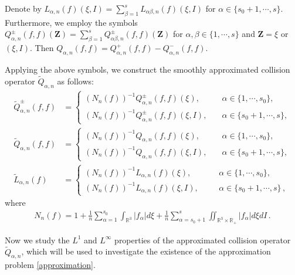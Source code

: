 \documentclass[reqno,11pt]{amsart}
\numberwithin{equation}{section}
\def\R{\mathbb{R}}
\begin{document}
Denote by $L_{\alpha, n} (f) (\xi, I) = \sum_{\beta = 1}^{s} L_{\alpha \beta, n} (f) (\xi, I) $ for $\alpha \in \{ s_0 + 1, \cdots, s \} $. Furthermore, we employ the symbols $Q_{\alpha, n}^\pm (f,f) (\mathbf{Z}) = \sum_{\beta = 1}^{s} Q_{\alpha \beta, n}^\pm (f, f) (\mathbf{Z})$ for $\alpha, \beta \in \{ 1, \cdots, s \}$ and $ \mathbf{Z} = \xi $ or $(\xi, I)$. Then $Q_{\alpha ,n } (f,f) = Q^+_{\alpha ,n } (f,f) -Q^-_{\alpha ,n } (f,f)$.

Applying the above symbols, we construct the smoothly approximated collision operator $\tilde{Q}_{\alpha, n}$ as follows: 
\begin{equation}\label{Q L}
	\begin{aligned}
		\tilde{Q}^\pm _{\alpha ,n } (f,f) &=
		\begin{cases}
			( N_n (f) )^{-1} Q^\pm _{\alpha ,n } (f,f)(\xi ), \quad &\alpha \in \{1,\cdots, s_0 \},\\
			( N_n (f) )^{-1} Q^\pm _{\alpha ,n } (f,f)(\xi ,I ), \quad &\alpha \in \{s_0+1,\cdots, s \},
		\end{cases} \\
			\tilde{Q}_{\alpha ,n } (f,f) &=
		\begin{cases}
			( N_n (f) )^{-1} Q_{\alpha ,n } (f,f)(\xi ), \quad &\alpha \in \{1,\cdots, s_0 \},\\
			( N_n (f) )^{-1} Q_{\alpha ,n } (f,f)(\xi ,I ), \quad &\alpha \in \{s_0+1,\cdots, s \},
		\end{cases}\\
		\tilde{L} _{\alpha ,n } (f) &=
		\begin{cases}
			( N_n (f) )^{-1} L _{\alpha ,n } (f)(\xi ), \quad & \ \ \ \alpha \in \{1,\cdots, s_0 \},\\
			( N_n (f) )^{-1} L _{\alpha ,n } (f)(\xi ,I ), \quad & \ \ \ \alpha \in \{s_0+1,\cdots, s \} \,, 
		\end{cases}
	\end{aligned}
\end{equation}
where
\begin{equation}\label{Nnf}
  \begin{aligned}
    N_n (f) = 1 + \tfrac{1}{n} \sum_{\alpha = 1}^{s_0} \int_{\R^3} | f_\alpha | d \xi + \tfrac{1}{n} \sum_{\alpha = s_0 + 1}^{s} \iint_{\R^3\times \R_+} | f_\alpha | d\xi dI \,. 
  \end{aligned}
\end{equation}

Now we study the $L^1$ and $L^\infty$ properties of the approximated collision operator $\tilde{Q}_{\alpha, n}$, which will be used to investigate the existence of the approximation problem \eqref{approximation}.
\end{document}
